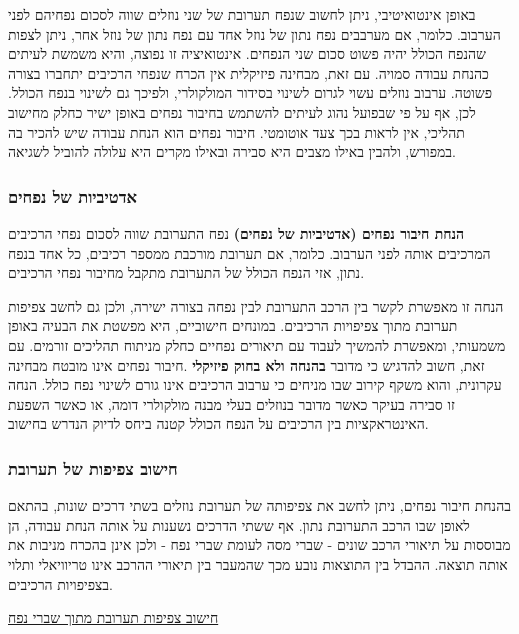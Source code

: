 \documentclass[
  hebrew,
  letterpaper,
  DIV=11,
  numbers=noendperiod]{scrreprt}
\begin{document}
באופן אינטואיטיבי, ניתן לחשוב שנפח תערובת של שני נוזלים שווה לסכום
נפחיהם לפני הערבוב. כלומר, אם מערבבים נפח נתון של נוזל אחד עם נפח נתון
של נוזל אחר, ניתן לצפות שהנפח הכולל יהיה פשוט סכום שני הנפחים.
אינטואיציה זו נפוצה, והיא משמשת לעיתים כהנחת עבודה סמויה. עם זאת, מבחינה
פיזיקלית אין הכרח שנפחי הרכיבים יתחברו בצורה פשוטה. ערבוב נוזלים עשוי
לגרום לשינוי בסידור המולקולרי, ולפיכך גם לשינוי בנפח הכולל. לכן, אף על
פי שבפועל נהוג לעיתים להשתמש בחיבור נפחים באופן ישיר כחלק מחישוב תהליכי,
אין לראות בכך צעד אוטומטי. חיבור נפחים הוא הנחת עבודה שיש להכיר בה
במפורש, ולהבין באילו מצבים היא סבירה ובאילו מקרים היא עלולה להוביל
לשגיאה.

\subsubsection{אדטיביות של
נפחים}\label{ux5d0ux5d3ux5d8ux5d9ux5d1ux5d9ux5d5ux5ea-ux5e9ux5dc-ux5e0ux5e4ux5d7ux5d9ux5dd}

\textbf{הנחת חיבור נפחים (אדטיביות של נפחים)} נפח התערובת שווה לסכום
נפחי הרכיבים המרכיבים אותה לפני הערבוב. כלומר, אם תערובת מורכבת ממספר
רכיבים, כל אחד בנפח נתון, אזי הנפח הכולל של התערובת מתקבל מחיבור נפחי
הרכיבים.

הנחה זו מאפשרת לקשר בין הרכב התערובת לבין נפחה בצורה ישירה, ולכן גם לחשב
צפיפות תערובת מתוך צפיפויות הרכיבים. במונחים חישוביים, היא מפשטת את
הבעיה באופן משמעותי, ומאפשרת להמשיך לעבוד עם תיאורים נפחיים כחלק מניתוח
תהליכים זורמים. עם זאת, חשוב להדגיש כי מדובר \textbf{בהנחה ולא בחוק
פיזיקלי} .חיבור נפחים אינו מובטח מבחינה עקרונית, והוא משקף קירוב שבו
מניחים כי ערבוב הרכיבים אינו גורם לשינוי נפח כולל. הנחה זו סבירה בעיקר
כאשר מדובר בנוזלים בעלי מבנה מולקולרי דומה, או כאשר השפעת האינטראקציות
בין הרכיבים על הנפח הכולל קטנה ביחס לדיוק הנדרש בחישוב.

\subsubsection{חישוב צפיפות של
תערובת}\label{ux5d7ux5d9ux5e9ux5d5ux5d1-ux5e6ux5e4ux5d9ux5e4ux5d5ux5ea-ux5e9ux5dc-ux5eaux5e2ux5e8ux5d5ux5d1ux5ea}

בהנחת חיבור נפחים, ניתן לחשב את צפיפותה של תערובת נוזלים בשתי דרכים
שונות, בהתאם לאופן שבו הרכב התערובת נתון. אף ששתי הדרכים נשענות על אותה
הנחת עבודה, הן מבוססות על תיאורי הרכב שונים - שברי מסה לעומת שברי נפח -
ולכן אינן בהכרח מניבות את אותה תוצאה. ההבדל בין התוצאות נובע מכך שהמעבר
בין תיאורי ההרכב אינו טריוויאלי ותלוי בצפיפויות הרכיבים.

\ul{חישוב צפיפות תערובת מתוך שברי נפח}
\end{document}
